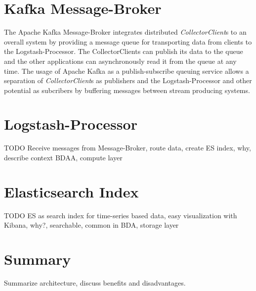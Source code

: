 \section{Kafka Message-Broker}

The Apache Kafka Message-Broker integrates distributed \textit{CollectorClient}s to an overall system by providing a
message queue for transporting data from clients to the Logstash-Processor. The CollectorClients can publish
its data to the queue and the other applications can asynchronously read it from the queue at any time.
The usage of Apache Kafka as a publish-subscribe queuing service allows a separation of \textit{CollectorClient}s as publishers and the
Logstash-Processor and other potential as subcribers by buffering messages between stream producing systems.

\section{Logstash-Processor}
%

TODO
Receive messages from Message-Broker, route data, create ES index, why, describe context BDAA, compute layer
%
\section{Elasticsearch Index}
TODO
ES as search index for time-series based data, easy visualization with Kibana, why?, searchable, common in BDA, storage layer

\section{Summary}

Summarize architecture, discuss benefits and disadvantages.



